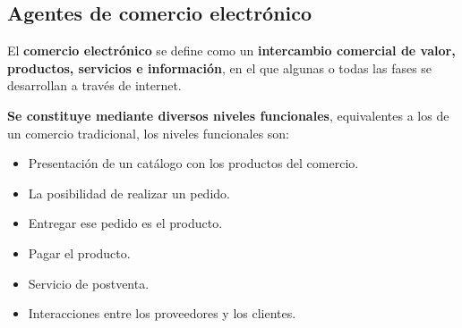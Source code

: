 \documentclass[12pt, twoside, openright]{report} %
\begin{document}
\subsection{Agentes de comercio electrónico}
El \textbf{comercio electrónico} se define como un \textbf{intercambio comercial de valor, productos, servicios e información}, en el que algunas o todas las fases se desarrollan a través de internet. 

\textbf{Se constituye mediante diversos niveles funcionales}, equivalentes a los de un comercio tradicional, los niveles funcionales son:
\begin{itemize}
	\item Presentación de un catálogo con los productos del comercio.
	\item La posibilidad de realizar un pedido.
	\item Entregar ese pedido es el producto.
	\item Pagar el producto.
	\item Servicio de postventa.
	\item Interacciones entre los proveedores y los clientes.
\end{itemize}
\end{document}
